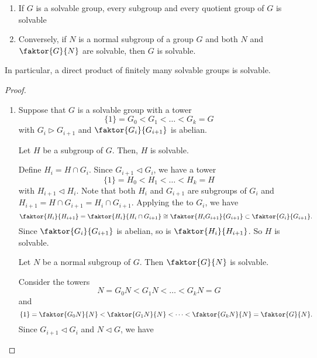 \documentclass[11pt]{article}
\newcommand{\quotient}[2]{\faktor{#1}{#2}}
\begin{document}
\begin{theorem}\leavevmode
\begin{enumerate}
\item If $G$ is a solvable group, every subgroup and every quotient group of $G$
is solvable
\item Conversely, if $N$ is a normal subgroup of a group $G$ and both $N$ and
$\quotient{G}{N}$ are solvable, then $G$ is solvable.
\end{enumerate}
In particular, a direct product of finitely many solvable groups is solvable.
\label{theorem38}
\end{theorem}
\begin{proof}\leavevmode
\begin{enumerate}
\item Suppose that $G$ is a solvable group with a tower
\begin{equation*}
\{1\} = G_0 < G_1 < \dots < G_k = G
\end{equation*}
with $G_i \triangleright G_{i+1}$ and  $\quotient{G_i}{G_{i+1}}$ is abelian.
\begin{claim}
Let $H$ be a subgroup of $G$. Then, $H$ is solvable.
\end{claim}
Define $H_i = H \cap G_i$. Since $G_{i+1} \triangleleft G_i$, we have a tower
\begin{equation*}
\{1\} = H_0 < H_1 < \dots < H_k = H
\end{equation*}
with $H_{i+1} \triangleleft H_i$. Note that both $H_i$ and $G_{i+1}$ are
subgroups of $G_i$ and $H_{i+1} = H \cap G_{i+1} = H_i \cap G_{i+1}$. Applying
the  to $G_i$, we have
\begin{equation*}
\quotient{H_i}{H_{i+1}} = \quotient{H_i}{H_i \cap G_{i+1}} \cong 
\quotient{H_iG_{i+1}}{G_{i+1}} \subset \quotient{G_i}{G_{i+1}}.
\end{equation*}
Since $\quotient{G_i}{G_{i+1}}$ is abelian, so is $\quotient{H_i}{H_{i+1}}$. So
$H$ is solvable.
\begin{claim}
Let $N$ be a normal subgroup of $G$. Then $\quotient{G}{N}$ is solvable.
\end{claim}
Consider the towers
\begin{equation*}
N = G_0N < G_1N < \dots < G_kN = G
\end{equation*}
and
\begin{equation*}
\{1\} = \quotient{G_0N}{N} < \quotient{G_1N}{N} < \dots <
\quotient{G_kN}{N} = \quotient{G}{N}.
\end{equation*}
Since $G_{i+1} \triangleleft G_i$ and $N \triangleleft G$, we have

\end{enumerate}
\end{proof}
\end{document}
